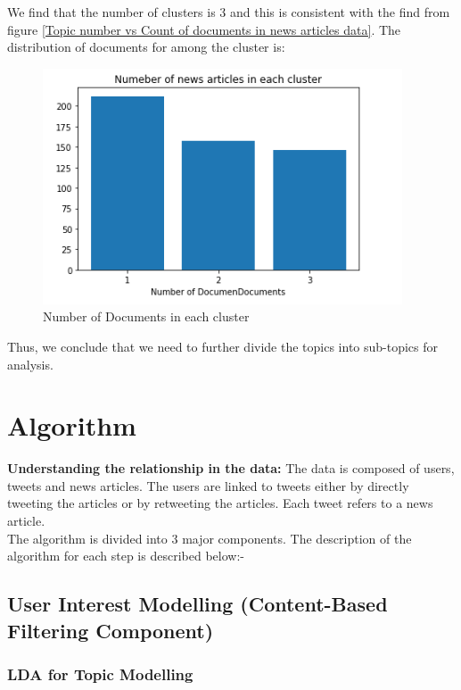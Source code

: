 \documentclass{article}
\begin{document}
We find that the number of clusters is 3 and this is consistent with the find from figure \ref{Topic number vs Count of documents in news articles data}. The distribution of documents for among the cluster  is:
\begin{figure}[H]
    \centering
    \includegraphics{cluster.PNG}
    \caption{Number of Documents in each cluster}
    \label{Number of Documents in each cluster}
\end{figure}



Thus, we conclude that we need to further divide the topics into sub-topics for analysis.


\section{Algorithm}

\textbf{Understanding the relationship in the data:} The data is composed of users, tweets and news articles. The users are linked to tweets either by directly tweeting the articles or by retweeting the articles. Each tweet refers to a news article. \\

The algorithm is divided into 3 major components. The description of the algorithm for each step is described below:- \\

\subsection{User Interest Modelling (Content-Based Filtering Component)}

\subsubsection{LDA for Topic Modelling}
\end{document}
